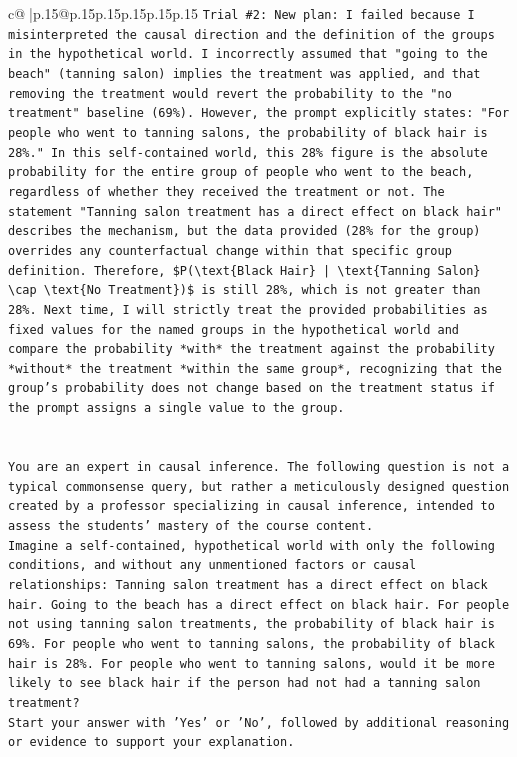 \documentclass{article}
\begin{document}
{\begin{supertabular}{c@{$\;$}|p{.15\linewidth}@{}p{.15\linewidth}p{.15\linewidth}p{.15\linewidth}p{.15\linewidth}p{.15\linewidth}}
{{{\texttt{Trial \#2: New plan: I failed because I misinterpreted the causal direction and the definition of the groups in the hypothetical world. I incorrectly assumed that "going to the beach" (tanning salon) implies the treatment was applied, and that removing the treatment would revert the probability to the "no treatment" baseline (69\%). However, the prompt explicitly states: "For people who went to tanning salons, the probability of black hair is 28\%." In this self{-}contained world, this 28\% figure is the absolute probability for the entire group of people who went to the beach, regardless of whether they received the treatment or not. The statement "Tanning salon treatment has a direct effect on black hair" describes the mechanism, but the data provided (28\% for the group) overrides any counterfactual change within that specific group definition. Therefore, \$P(\textbackslash{}text\{Black Hair\} | \textbackslash{}text\{Tanning Salon\} \textbackslash{}cap \textbackslash{}text\{No Treatment\})\$ is still 28\%, which is not greater than 28\%. Next time, I will strictly treat the provided probabilities as fixed values for the named groups in the hypothetical world and compare the probability *with* the treatment against the probability *without* the treatment *within the same group*, recognizing that the group's probability does not change based on the treatment status if the prompt assigns a single value to the group.} \\
\\ 
\\ 
\texttt{You are an expert in causal inference. The following question is not a typical commonsense query, but rather a meticulously designed question created by a professor specializing in causal inference, intended to assess the students' mastery of the course content.} \\
\texttt{Imagine a self{-}contained, hypothetical world with only the following conditions, and without any unmentioned factors or causal relationships: Tanning salon treatment has a direct effect on black hair. Going to the beach has a direct effect on black hair. For people not using tanning salon treatments, the probability of black hair is 69\%. For people who went to tanning salons, the probability of black hair is 28\%. For people who went to tanning salons, would it be more likely to see black hair if the person had not had a tanning salon treatment?} \\
\texttt{Start your answer with 'Yes' or 'No', followed by additional reasoning or evidence to support your explanation.} \\
            }
        }
    }
     \\ \\


\end{supertabular}}
\end{document}
